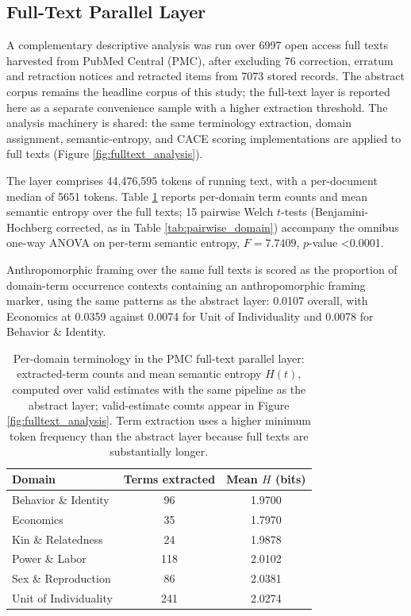 \documentclass[
]{article}
\numberwithin{equation}{section}
\begin{document}
\subsection{Full-Text Parallel Layer}\label{full-text-parallel-layer}

A complementary descriptive analysis was run over 6997 open access full
texts harvested from PubMed Central (PMC), after excluding 76
correction, erratum and retraction notices and retracted items from 7073
stored records. The abstract corpus remains the headline corpus of this
study; the full-text layer is reported here as a separate convenience
sample with a higher extraction threshold. The analysis machinery is
shared: the same terminology extraction, domain assignment,
semantic-entropy, and CACE scoring implementations are applied to full
texts (Figure \ref{fig:fulltext_analysis}).

The layer comprises 44,476,595 tokens of running text, with a
per-document median of 5651 tokens. Table \ref{tab:fulltext_domain}
reports per-domain term counts and mean semantic entropy over the full
texts; 15 pairwise Welch \(t\)-tests (Benjamini-Hochberg corrected, as
in Table \ref{tab:pairwise_domain}) accompany the omnibus one-way ANOVA
on per-term semantic entropy, \(F = 7.7409\), \(p\)-value
\textless0.0001.

Anthropomorphic framing over the same full texts is scored as the
proportion of domain-term occurrence contexts containing an
anthropomorphic framing marker, using the same patterns as the abstract
layer: 0.0107 overall, with Economics at 0.0359 against 0.0074 for Unit
of Individuality and 0.0078 for Behavior \& Identity.

\begin{table}[h]
\centering
\begin{tabular}{|l|c|c|}
\hline
\textbf{Domain} & \textbf{Terms extracted} & \textbf{Mean $H$ (bits)} \\
\hline
Behavior \& Identity & 96 & 1.9700 \\
Economics & 35 & 1.7970 \\
Kin \& Relatedness & 24 & 1.9878 \\
Power \& Labor & 118 & 2.0102 \\
Sex \& Reproduction & 86 & 2.0381 \\
Unit of Individuality & 241 & 2.0274 \\
\hline
\end{tabular}
\caption{Per-domain terminology in the PMC full-text parallel layer: extracted-term counts and mean semantic entropy $H(t)$, computed over valid estimates with the same pipeline as the abstract layer; valid-estimate counts appear in Figure \ref{fig:fulltext_analysis}. Term extraction uses a higher minimum token frequency than the abstract layer because full texts are substantially longer.}
\label{tab:fulltext_domain}
\end{table}
\end{document}
